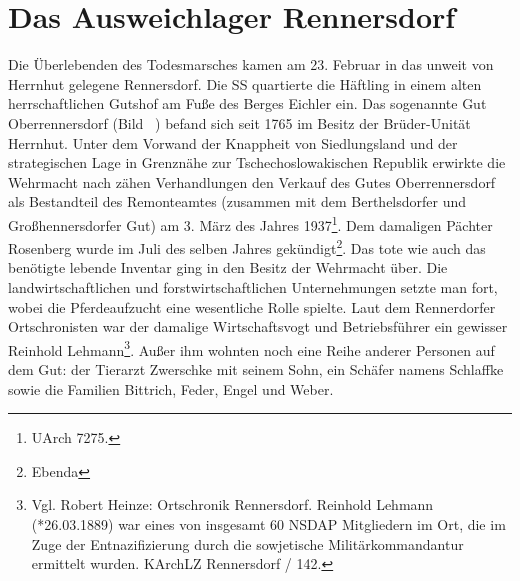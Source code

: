 \section{Das Ausweichlager Rennersdorf}

Die Überlebenden des Todesmarsches kamen am 23. Februar in das unweit von Herrnhut gelegene Rennersdorf. Die SS quartierte die Häftling in einem alten herrschaftlichen Gutshof am Fuße des Berges Eichler ein.
Das sogenannte Gut Oberrennersdorf (Bild ~) befand sich seit 1765 im Besitz der Brüder-Unität Herrnhut.
Unter dem Vorwand der Knappheit von Siedlungsland und der strategischen Lage in Grenz\-nähe zur Tschechoslowakischen Republik erwirkte die Wehrmacht nach zähen Verhandlungen den Verkauf des Gutes Oberrennersdorf als Bestandteil des Remonteamtes (zusammen mit dem Berthelsdorfer und Großhennersdorfer Gut) am 3. März des Jahres 1937\footnote{UArch 7275.}. Dem damaligen Pächter Rosenberg wurde im Juli des selben Jahres gekündigt\footnote{Ebenda}. 
Das tote wie auch das benötigte lebende Inventar ging in den Besitz der Wehrmacht über. Die landwirtschaftlichen und forstwirtschaftlichen Unternehmungen setzte man fort, wobei die Pferdeaufzucht eine wesentliche Rolle spielte. 
Laut dem Rennerdorfer Ortschronisten war der damalige Wirtschaftsvogt und Betriebsführer ein gewisser Reinhold Lehmann\footnote{Vgl. Robert Heinze: Ortschronik Rennersdorf. Reinhold Lehmann (*26.03.1889) war eines von insgesamt 60 NSDAP Mitgliedern im Ort, die im Zuge der Entnazifizierung durch die sowjetische Militärkommandantur ermittelt wurden. KArchLZ Rennersdorf / 142. }. Außer ihm wohnten noch eine Reihe anderer Personen auf dem Gut: der Tierarzt Zwerschke mit seinem Sohn, ein Schäfer namens Schlaffke sowie die Familien Bittrich, Feder, Engel und Weber. 

